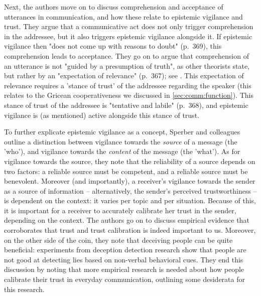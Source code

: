 Next, the authors move on to discuss comprehension and acceptance of utterances in communication, and how these relate to epistemic vigilance and trust.
They argue that a communicative act does not only trigger comprehension in the addressee, but it also triggers epistemic vigilance alongside it. If epistemic vigilance then "does not come up with reasons to doubt" (p.~369), this comprehension leads to acceptance.
They go on to argue that comprehension of an utterance is not "guided by a presumption of truth", as other theorists state, but rather by an "expectation of relevance" (p.~367); see \citet{SperberWilson86}. This expectation of relevance requires a 'stance of trust' of the addressee regarding the speaker (this relates to the Gricean cooperativeness we discussed in \cref{sec:comm:function}).
This stance of trust of the addressee is "tentative and labile" (p.~368), and epistemic vigilance is (as mentioned) active alongside this stance of trust.


To further explicate epistemic vigilance as a concept, Sperber and colleagues outline a distinction between vigilance towards the \emph{source} of a message (the 'who'), and vigilance towards the \emph{content} of the message (the 'what').
As for vigilance towards the source, they note that the reliability of a source depends on two factors: a reliable source must be competent, and a reliable source must be benevolent.
Moreover (and importantly), a receiver's vigilance towards the sender as a source of information -- alternatively, the sender's perceived trustworthiness -- is dependent on the context: it varies per topic and per situation.
Because of this, it is important for a receiver to accurately calibrate her trust in the sender, depending on the context.
The authors go on to discuss empirical evidence that corroborates that trust and trust calibration is indeed important to us.
Moreover, on the other side of the coin, they note that deceiving people can be quite beneficial: experiments from deception detection research show that people are not good at detecting lies based on non-verbal behavioral cues.
They end this discussion by noting that more empirical research is needed about how people calibrate their trust in everyday communication, outlining some desiderata for this research.

